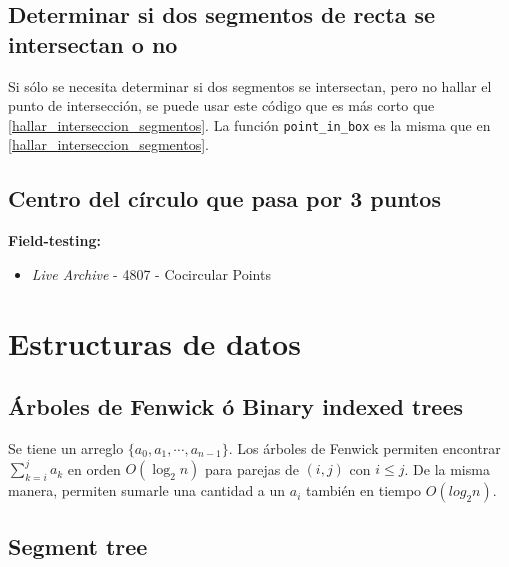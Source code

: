 \documentclass[10pt,letterpaper,twocolumn,twosided]{article}
\newcommand{\codigofuente}[1]{

\dotfill
}
\begin{document}
\codigofuente{./src/geometria/segment_segment_intersection.cpp}

\subsection{Determinar si dos segmentos de recta se intersectan o no}

Si sólo se necesita determinar si dos segmentos se intersectan, pero no hallar
el punto de intersección, se puede usar este código que es más corto que \ref{hallar_interseccion_segmentos}.
La función \verb!point_in_box! es la misma que en \ref{hallar_interseccion_segmentos}.

\codigofuente{./src/geometria/check_segment_intersection.cpp}

\subsection{Centro del círculo que pasa por 3 puntos}
\small
\textbf{Field-testing:}
\begin{itemize}
\item \emph{Live Archive} - 4807 - Cocircular Points
\end{itemize}
\normalsize

\codigofuente{./src/geometria/circle_through_3_points.cpp}

\section{Estructuras de datos}
\subsection{Árboles de Fenwick ó Binary indexed trees}

Se tiene un arreglo $\{a_0, a_1, \cdots, a_{n-1}\}$. Los árboles
de Fenwick permiten encontrar $ \displaystyle \sum_{k=i}^{j} a_k $ en orden $O(\log_{2}{n})$ para parejas de $(i, j)$ con $i \leq j$. De la misma manera, permiten sumarle una cantidad a un $a_i$ también en tiempo $O(log_{2}{n})$.
\medskip
\codigofuente{./src/estructuras/fenwick.cpp}

\subsection{Segment tree}
\codigofuente{./src/estructuras/segment_tree.cpp}

\end{document}
